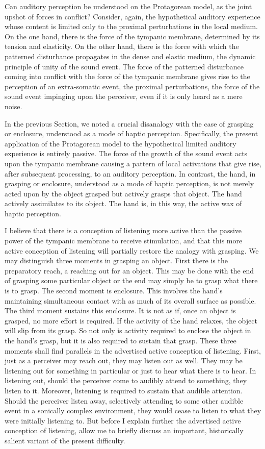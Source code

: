 Can auditory perception be understood on the Protagorean model, as the joint upshot of forces in conflict? Consider, again, the hypothetical auditory experience whose content is limited only to the proximal perturbations in the local medium. On the one hand, there is the force of the tympanic membrane, determined by its tension and elasticity. On the other hand, there is the force with which the patterned disturbance propagates in the dense and elastic medium, the dynamic principle of unity of the sound event. The force of the patterned disturbance coming into conflict with the force of the tympanic membrane gives rise to the perception of an extra-somatic event, the proximal perturbations, the force of the sound event impinging upon the perceiver, even if it is only heard as a mere noise.

In the previous Section, we noted a crucial disanalogy with the case of grasping or enclosure, understood as a mode of haptic perception. Specifically, the present application of the Protagorean model to the hypothetical limited auditory experience is entirely passive. The force of the growth of the sound event acts upon the tympanic membrane causing a pattern of local activations that give rise, after subsequent processing, to an auditory perception. In contrast, the hand, in grasping or enclosure, understood as a mode of haptic perception, is not merely acted upon by the object grasped but actively grasps that object. The hand actively assimilates to its object. The hand is, in this way, the active wax of haptic perception.

I believe that there is a conception of listening more active than the passive power of the tympanic membrane to receive stimulation, and that this more active conception of listening will partially restore the analogy with grasping. We may distinguish three moments in grasping an object. First there is the preparatory reach, a reaching out for an object. This may be done with the end of grasping some particular object or the end may simply be to grasp what there is to grasp. The second moment is enclosure. This involves the hand's maintaining simultaneous contact with as much of its overall surface as possible. The third moment sustains this enclosure. It is not as if, once an object is grasped, no more effort is required. If the activity of the hand relaxes, the object will slip from its grasp. So not only is activity required to enclose the object in the hand's grasp, but it is also required to sustain that grasp. These three moments shall find parallels in the advertised active conception of listening. First, just as a perceiver may reach out, they may listen out as well. They may be listening out for something in particular or just to hear what there is to hear. In listening out, should the perceiver come to audibly attend to something, they listen to it. Moreover, listening is required to sustain that audible attention. Should the perceiver listen away, selectively attending to some other audible event in a sonically complex environment, they would cease to listen to what they were initially listening to. But before I explain further the advertised active conception of listening, allow me to briefly discuss an important, historically salient variant of the present difficulty.

